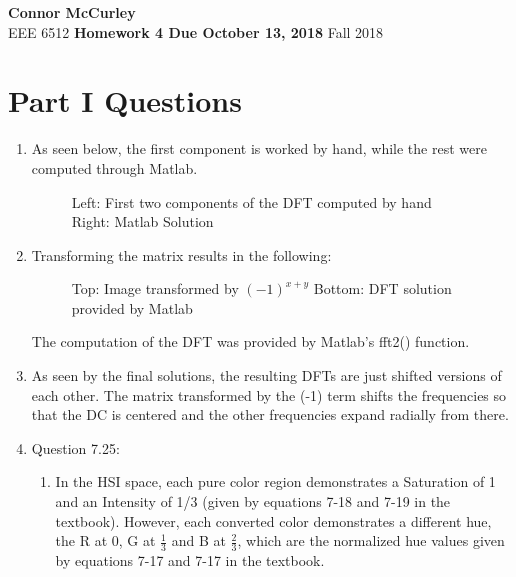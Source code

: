 \documentclass{article}[12 pt]
\begin{document}
	
\begin{center}
	\textbf{\Large Connor McCurley} \\
	EEE 6512 \qquad \textbf{\large Homework 4 Due October 13, 2018} \qquad Fall 2018 
\end{center}

\section*{Part I Questions}

\begin{enumerate}
\item As seen below, the first component is worked by hand, while the rest were computed through Matlab.

\begin{figure}[h!]
\captionsetup[subfloat]{labelformat=empty}
\centering
{}
\newline
{}
\caption{Left: First two components of the DFT computed by hand Right: Matlab Solution}
\end{figure}

\newpage
\item Transforming the matrix results in the following:

\begin{figure}[h!]
\captionsetup[subfloat]{labelformat=empty}
\centering
{}
\newline
{}
\caption{Top: Image transformed by $(-1)^{x+y}$ Bottom: DFT solution provided by Matlab}
\end{figure}

The computation of the DFT was provided by Matlab's fft2() function.

\item As seen by the final solutions, the resulting DFTs are just shifted versions of each other.  The matrix transformed by the (-1) term shifts the frequencies so that the DC is centered and the other frequencies expand radially from there.

\item Question 7.25:
	\begin{enumerate}[label=\alph*]
		\item In the HSI space, each pure color region demonstrates a Saturation of 1 and an Intensity of 1/3 (given by equations 7-18 and 7-19 in the textbook).  However, each converted color demonstrates a different hue, the R at 0, G at $\frac{1}{3}$ and B at $\frac{2}{3}$, which are the normalized hue values given by equations 7-17 and 7-17 in the textbook.


\end{enumerate}
\end{enumerate}
\end{document}

